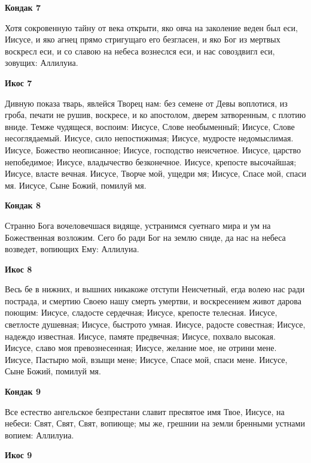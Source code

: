 \medskip


\bfseries Кондак 7\normalfont{}


Хотя сокровенную тайну от века открыти, яко овча на заколение веден был еси, Иисусе, и яко агнец прямо стригущаго его безгласен, и яко Бог из мертвых воскресл еси, и со славою на небеса вознеслся еси, и нас совоздвигл еси, зовущих: Аллилуиа.


\medskip


\bfseries Икос 7\normalfont{}


Дивную показа тварь, явлейся Творец нам: без семене от Девы воплотися, из гроба, печати не рушив, воскресе, и ко апостолом, дверем затворенным, с плотию вниде. Темже чудящеся, воспоим: Иисусе, Слове необыменный; Иисусе, Слове несоглядаемый. Иисусе, сило непостижимая; Иисусе, мудросте недомыслимая. Иисусе, Божество неописанное; Иисусе, господство неисчетное. Иисусе, царство непобедимое; Иисусе, владычество безконечное. Иисусе, крепосте высочайшая; Иисусе, власте вечная. Иисусе, Творче мой, ущедри мя; Иисусе, Спасе мой, спаси мя. Иисусе, Сыне Божий, помилуй мя.


\medskip


\bfseries Кондак 8\normalfont{}


Странно Бога вочеловечшася видяще, устранимся суетнаго мира и ум на Божественная возложим. Сего бо ради Бог на землю сниде, да нас на небеса возведет, вопиющих Ему: Аллилуиа.


\medskip


\bfseries Икос 8\normalfont{}


Весь бе в нижних, и вышних никакоже отступи Неисчетный, егда волею нас ради пострада, и смертию Своею нашу смерть умертви, и воскресением живот дарова поющим: Иисусе, сладосте сердечная; Иисусе, крепосте телесная. Иисусе, светлосте душевная; Иисусе, быстрото умная. Иисусе, радосте совестная; Иисусе, надеждо известная. Иисусе, памяте предвечная; Иисусе, похвало высокая. Иисусе, славо моя превознесенная; Иисусе, желание мое, не отрини мене. Иисусе, Пастырю мой, взыщи мене; Иисусе, Спасе мой, спаси мене. Иисусе, Сыне Божий, помилуй мя.


\medskip


\bfseries Кондак 9\normalfont{}


Все естество ангельское безпрестани славит пресвятое имя Твое, Иисусе, на небеси: Свят, Свят, Свят, вопиюще; мы же, грешнии на земли бренными устнами вопием: Аллилуиа.


\medskip


\bfseries Икос 9\normalfont{}


